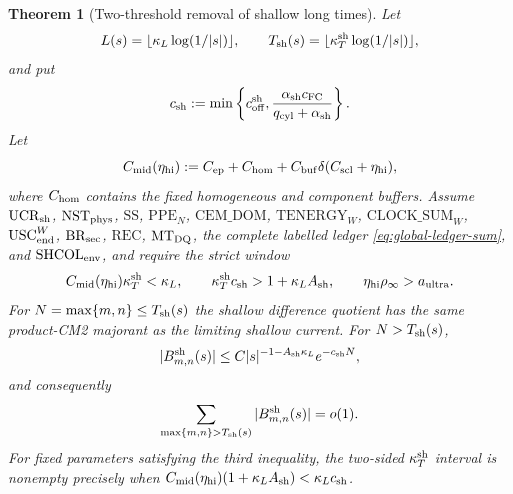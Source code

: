 \documentclass[11pt]{article}
\newtheorem{theorem}{Theorem}[section]
\begin{document}
\begin{theorem}[Two-threshold removal of shallow long times]
\label{thm:shallow-two-threshold}
Let
\[
 L(s)=\lfloor\kappa_L\log(1/|s|)\rfloor,
 \qquad T_{\rm sh}(s)=\lfloor\kappa_T^{\rm sh}\log(1/|s|)\rfloor,
\]
and put
\begin{equation}
\label{eq:shallow-collar-rate}
 c_{\rm sh}:=\min\left\{c_{\rm off}^{\rm sh},
 \frac{\alpha_{\rm sh}c_{\rm FC}}
 {q_{\rm cyl}+\alpha_{\rm sh}}\right\}.
\end{equation}
Let
\begin{equation}
\label{eq:intermediate-resolving-constant}
 C_{\rm mid}(\eta_{\rm hi})
 :=C_{\rm ep}+C_{\rm hom}
   +C_{\rm buf}\delta(C_{\rm scl}+\eta_{\rm hi}),
\end{equation}
where $C_{\rm hom}$ contains the fixed homogeneous and component buffers.
Assume $\mathrm{UCR}_{\rm sh}$, $\mathrm{NST}_{\rm phys}$,
$\mathrm{SS}$, $\mathrm{PPE}_{N}$, $\mathrm{CEM\_DOM}$,
$\mathrm{TENERGY}_{W}$,
$\mathrm{CLOCK\_SUM}_{W}$,
$\mathrm{USC}_{\rm end}^{W}$,
$\mathrm{BR}_{\rm sec}$, $\mathrm{REC}$, $\mathrm{MT}_{\rm DQ}$, the
complete labelled ledger \eqref{eq:global-ledger-sum}, and
$\mathrm{SHCOL}_{\rm env}$, and require the strict window
\begin{equation}
\label{eq:shallow-time-window}
 C_{\rm mid}(\eta_{\rm hi})\kappa_T^{\rm sh}<\kappa_L,
 \qquad
 \kappa_T^{\rm sh}c_{\rm sh}>1+\kappa_LA_{\rm sh},
 \qquad \eta_{\rm hi}\rho_\infty>a_{\rm ultra}.
\end{equation}
For $N=\max\{m,n\}\le T_{\rm sh}(s)$ the shallow difference quotient has
the same product-CM2 majorant as the limiting shallow current.  For
$N>T_{\rm sh}(s)$,
\begin{equation}
\label{eq:shallow-long-time-bound}
 |B^{\rm sh}_{m,n}(s)|
 \le C|s|^{-1-A_{\rm sh}\kappa_L}e^{-c_{\rm sh}N},
\end{equation}
and consequently
\begin{equation}
\label{eq:shallow-long-time-sum}
 \sum_{\max\{m,n\}>T_{\rm sh}(s)}
 |B^{\rm sh}_{m,n}(s)|=o(1).
\end{equation}
For fixed parameters satisfying the third inequality, the two-sided
$\kappa_T^{\rm sh}$ interval is nonempty precisely when
$C_{\rm mid}(\eta_{\rm hi})(1+\kappa_LA_{\rm sh})
 <\kappa_Lc_{\rm sh}$.
\end{theorem}
\end{document}
